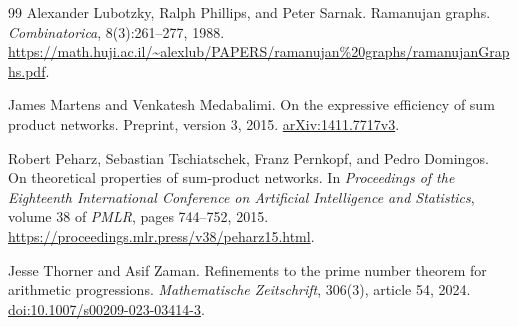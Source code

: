 \documentclass[11pt]{article}
\theoremstyle{definition}
\theoremstyle{remark}
\numberwithin{equation}{section}
\begin{document}
\begin{thebibliography}{99}
Alexander Lubotzky, Ralph Phillips, and Peter Sarnak.
Ramanujan graphs.
\emph{Combinatorica}, 8(3):261--277, 1988.
\url{https://math.huji.ac.il/~alexlub/PAPERS/ramanujan%20graphs/ramanujanGraphs.pdf}.

James Martens and Venkatesh Medabalimi.
On the expressive efficiency of sum product networks.
Preprint, version 3, 2015.
\href{https://arxiv.org/abs/1411.7717v3}{arXiv:1411.7717v3}.

Robert Peharz, Sebastian Tschiatschek, Franz Pernkopf, and Pedro Domingos.
On theoretical properties of sum-product networks.
In \emph{Proceedings of the Eighteenth International Conference on
Artificial Intelligence and Statistics},
volume 38 of \emph{PMLR}, pages 744--752, 2015.
\url{https://proceedings.mlr.press/v38/peharz15.html}.

Jesse Thorner and Asif Zaman.
Refinements to the prime number theorem for arithmetic progressions.
\emph{Mathematische Zeitschrift}, 306(3), article 54, 2024.
\href{https://doi.org/10.1007/s00209-023-03414-3}{doi:10.1007/s00209-023-03414-3}.

\end{thebibliography}
\end{document}
